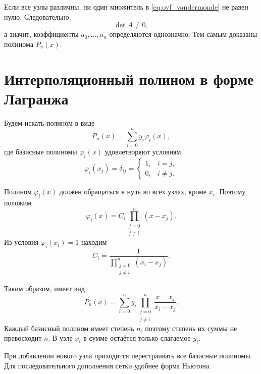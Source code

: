 \documentclass[../final.tex]{subfiles}
\begin{document}
Если все узлы различны, ни один множитель в
\eqref{eq:ovf_vandermonde} не равен нулю. Следовательно,
%
\begin{equation*}
    \det A\ne0,
\end{equation*}
%
а значит, коэффициенты $a_0,\ldots,a_n$ определяются однозначно.
Тем самым доказаны  полинома $P_n(x)$.

\section{Интерполяционный полином в форме Лагранжа}

Будем искать полином в виде
%
\begin{equation*}
    P_n(x)=\sum_{i=0}^{n}y_i\varphi_i(x),
\end{equation*}
%
где базисные полиномы $\varphi_i(x)$ удовлетворяют условиям
%
\begin{equation*}
    \varphi_i(x_j)=\delta_{ij}
    =\begin{cases}1,&i=j,\\0,&i\ne j.\end{cases}
\end{equation*}

Полином $\varphi_i(x)$ должен обращаться в нуль во всех узлах,
кроме $x_i$. Поэтому положим
%
\begin{equation*}
    \varphi_i(x)=C_i\prod_{\substack{j=0\\j\ne i}}^{n}(x-x_j).
\end{equation*}
%
Из условия $\varphi_i(x_i)=1$ находим
%
\begin{equation*}
    C_i=\frac{1}{\displaystyle\prod_{\substack{j=0\\j\ne i}}^{n}(x_i-x_j)}.
\end{equation*}

Таким образом,  имеет вид
%
\begin{equation}
    P_n(x)=\sum_{i=0}^{n}y_i
    \prod_{\substack{j=0\\j\ne i}}^{n}\frac{x-x_j}{x_i-x_j}.
    \label{eq:ovf_lagrange}
\end{equation}
%
Каждый базисный полином имеет степень $n$, поэтому степень их суммы
не превосходит $n$. В узле $x_i$ в сумме остаётся только слагаемое $y_i$.

При добавлении нового узла приходится перестраивать все базисные
полиномы. Для последовательного дополнения сетки удобнее форма Ньютона.
\end{document}
